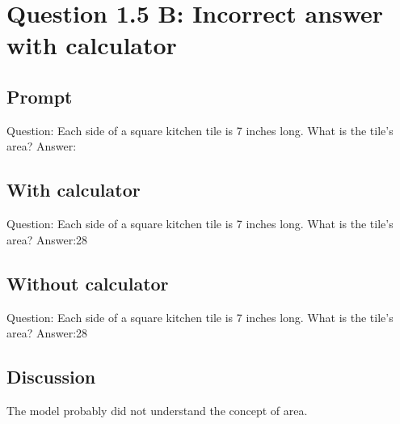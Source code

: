 \documentclass[11pt]{article}
\begin{document}
\section{Question 1.5 B: Incorrect answer with calculator}
\label{sec:orgca66291}
\subsection{Prompt}
\label{sec:org9d5eee1}
Question: Each side of a square kitchen tile is 7 inches long. What is the tile's area?
Answer:
\subsection{With calculator}
\label{sec:orgd90bee6}
Question: Each side of a square kitchen tile is 7 inches long. What is the tile's area?
Answer:\label{org5322700}28
\subsection{Without calculator}
\label{sec:org2a1d846}
Question: Each side of a square kitchen tile is 7 inches long. What is the tile's area?
Answer:\label{orgf4d1402}28
\subsection{Discussion}
\label{sec:orgfdd4b80}
The model probably did not understand the concept of area.
\end{document}
